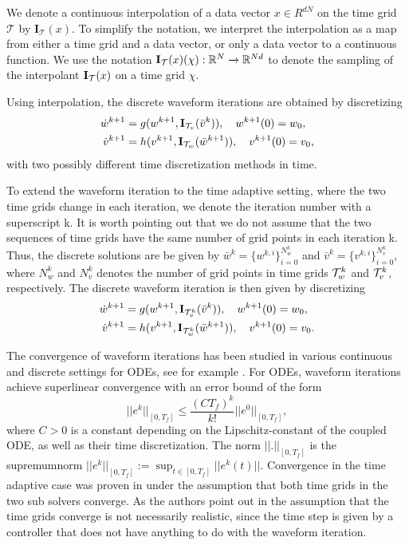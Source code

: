 \begin{definition}
We denote a continuous interpolation of a data vector $x \in R^{dN}$ on the time grid $\mathcal{T}$ by $ \mathbf{I}_\mathcal{T}(x)$. To simplify the notation, we interpret the interpolation as a map from either a time grid and a data vector, or only a data vector to a continuous function. We use the notation $\mathbf{I}_{{\cal T}}(x)(\chi): \mathbb{R}^{N} \xrightarrow{} \mathbb{R}^{Nd}$ to denote the sampling of the interpolant $\mathbf{I}_{{\cal T}}(x)$ on a time grid $\chi$.  
\end{definition}

Using interpolation, the discrete waveform iterations are obtained by discretizing 
\begin{align*}
	\dot{w}^{k+1} & = g( w^{k+1}, \mathbf{I}_{{\cal T}_v}( \bar{v}^{k})), \quad w^{k+1}(0) = w_0, \\
	\dot{v}^{k+1} & = h(v^{k+1}, \mathbf{I}_{{\cal T}_w}( \bar{w}^{k+1})) , \quad v^{k+1}(0) = v_0,
\end{align*}
with two possibly different time discretization methods in time. 

To extend the waveform iteration to the time adaptive setting, where the two time grids change in each iteration, we denote the iteration number with a superscript k. It is worth pointing out that we do not assume that the two sequences of time grids have the same number of grid points in each iteration k. Thus, the discrete solutions are be given by $\bar{w}^{k} =\{w^{k,i}\}_{i=0}^{N_w^k}$ and $\bar{v}^{k} =\{v^{k,i}\}_{i=0}^{N_v^k}$, where ${N_w^k}$ and ${N_v^k}$ denotes the number of grid points in time grids ${\cal T}_w^k$ and ${\cal T}_v^k$, respectively. The discrete waveform iteration is then given by discretizing 
\begin{align*}
	\dot{w}^{k+1} & = g( w^{k+1}, \mathbf{I}_{{\cal T}_v^k}( \bar{v}^{k})), \quad w^{k+1}(0) = w_0, \\
	\dot{v}^{k+1} & = h(v^{k+1}, \mathbf{I}_{{\cal T}_w^k}( \bar{w}^{k+1})) , \quad v^{k+1}(0) = v_0.
\end{align*}

The convergence of waveform iterations has been studied in various continuous and discrete settings for ODEs, see for example \cite{Ne89Cont,Ne89Disc}. For ODEs, waveform iterations achieve superlinear convergence with an error bound of the form
\begin{equation*}
	||e^{k}||_{[0,T_f]} \leq \frac{(CT_f)^k}{k!} ||e^0||_{[0,T_f]},
\end{equation*}
where $C>0$ is a constant depending on the Lipschitz-constant of the coupled ODE, as well as their time discretization. The norm $||.||_{[0,T_f]}$ is the supremumnorm $||e^k||_{[0,T_f]} := \sup_{t \in [0,T_f]} ||e^k(t)||$. Convergence in the time adaptive case was proven in \cite{BeZe93} under the assumption that both time grids in the two sub solvers converge. As the authors point out in \cite{BeZe93} the assumption that the time grids converge is not necessarily realistic, since the time step is given by a controller that does not have anything to do with the waveform iteration. 

